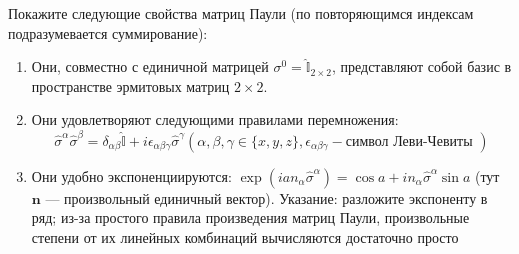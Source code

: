 \begin{exercise}
Покажите следующие свойства матриц Паули (по повторяющимся индексам подразумевается суммирование):
 	\begin{enumerate}
		\item 
		Они, совместно с единичной матрицей $\sigma^{0}=\hat{\mathbb{I}}_{2 \times 2}$, представляют собой базис в пространстве эрмитовых матриц $2 \times 2$.
		\item 
		Они удовлетворяют следующими правилами перемножения: $$\hat{\sigma}^{\alpha} \hat{\sigma}^{\beta}=\delta_{\alpha \beta} \hat{\mathbb{I}}+i \epsilon_{\alpha \beta \gamma} \hat{\sigma}^{\gamma} \left( \alpha, \beta, \gamma \in\{x, y, z\}, \epsilon_{\alpha \beta \gamma}  -\text{символ Леви-Чевиты }\right)$$
		\item 
		Они удобно экспоненциируются: $\exp \left(i a n_{\alpha} \hat{\sigma}^{\alpha}\right)=\cos a+i n_{\alpha} \hat{\sigma}^{\alpha} \sin a$ (тут $ \boldsymbol{n} $ — произвольный единичный вектор). Указание: разложите экспоненту в ряд; из-за простого правила произведения матриц Паули, произвольные степени от
		их линейных комбинаций вычисляются достаточно просто
	\end{enumerate}
	
\end{exercise}


